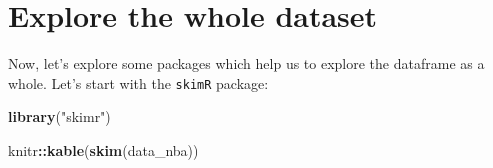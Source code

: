 \documentclass[
]{book}
\newenvironment{Shaded}{\begin{snugshade}}{\end{snugshade}}
\newcommand{\FunctionTok}[1]{\textcolor[rgb]{0.13,0.29,0.53}{\textbf{#1}}}
\newcommand{\NormalTok}[1]{#1}
\newcommand{\SpecialCharTok}[1]{\textcolor[rgb]{0.81,0.36,0.00}{\textbf{#1}}}
\newcommand{\StringTok}[1]{\textcolor[rgb]{0.31,0.60,0.02}{#1}}
\begin{document}
\hypertarget{explore-the-whole-dataset}{%
\section{Explore the whole dataset}\label{explore-the-whole-dataset}}

Now, let's explore some packages which help us to explore the dataframe as a whole.
Let's start with the \texttt{skimR} package:

\begin{Shaded}
\begin{Highlighting}[]
\FunctionTok{library}\NormalTok{(}\StringTok{"skimr"}\NormalTok{)}

\NormalTok{knitr}\SpecialCharTok{::}\FunctionTok{kable}\NormalTok{(}\FunctionTok{skim}\NormalTok{(data\_nba))}
\end{Highlighting}
\end{Shaded}
\end{document}
